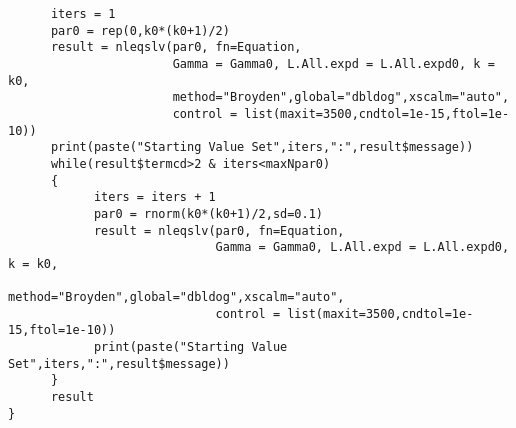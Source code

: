 \documentclass[11 pt, a4paper]{article}  %
\begin{document}
\begin{verbatim}
      iters = 1
      par0 = rep(0,k0*(k0+1)/2)
      result = nleqslv(par0, fn=Equation, 
                       Gamma = Gamma0, L.All.expd = L.All.expd0, k = k0,
                       method="Broyden",global="dbldog",xscalm="auto", 
                       control = list(maxit=3500,cndtol=1e-15,ftol=1e-10))
      print(paste("Starting Value Set",iters,":",result$message))
      while(result$termcd>2 & iters<maxNpar0)
      {
            iters = iters + 1
            par0 = rnorm(k0*(k0+1)/2,sd=0.1)
            result = nleqslv(par0, fn=Equation, 
                             Gamma = Gamma0, L.All.expd = L.All.expd0, k = k0,
                             method="Broyden",global="dbldog",xscalm="auto", 
                             control = list(maxit=3500,cndtol=1e-15,ftol=1e-10))
            print(paste("Starting Value Set",iters,":",result$message))
      } 
      result
}
\end{verbatim}

%
\end{document}

